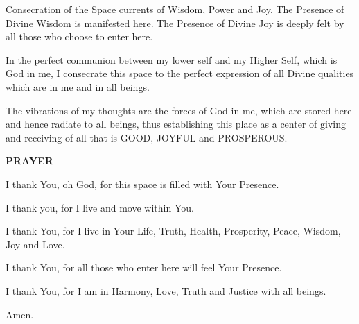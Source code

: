 \begin{passage}[EN]{Consecration of the Space}
    currents of Wisdom, Power and Joy. The Presence
    of Divine Wisdom is manifested here. The Presence
    of Divine Joy is deeply felt by all those who choose
    to enter here.
    \par
    In the perfect communion between my lower self and
    my Higher Self, which is God in me, I consecrate
    this space to the perfect expression of all Divine
    qualities which are in me and in all beings.
    \par
    The vibrations of my thoughts are the forces of God
    in me, which are stored here and hence radiate to
    all beings, thus establishing this place as a center
    of giving and receiving of all that is GOOD, JOYFUL
    and PROSPEROUS.
    \par
    \vspace{1ex}
    \textbf{PRAYER}
    \par
    I thank You, oh God, for this space is filled with
    Your Presence.
    \par
    I thank you, for I live and move within You.
    \par
    I thank You, for I live in Your Life, Truth, Health,
    Prosperity, Peace, Wisdom, Joy and Love.
    \par
    I thank You, for all those who enter here will feel
    Your Presence.
    \par
    I thank You, for I am in Harmony, Love, Truth and
    Justice with all beings.
    \par
    Amen.
  \end{passage}
